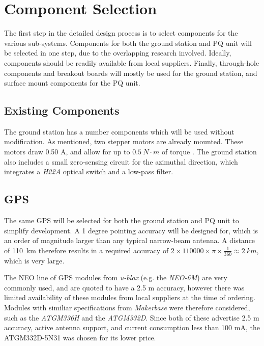 \graphicspath{{./figures}}

\section{Component Selection}
The first step in the detailed design process is to select components for the various sub-systems. Components for both the ground station and PQ unit will be selected in one step, due to the overlapping research involved. Ideally, components should be readily available from local suppliers. Finally, through-hole components and breakout boards will mostly be used for the ground station, and surface mount components for the PQ unit.

\subsection{Existing Components}
The ground station has a number components which will be used without modification. As mentioned, two stepper motors are already mounted. These motors draw 0.50 A, and allow for up to $\SI{0.5}{N \cdot m}$ of torque \cite{datasheet-4118}. The ground station also includes a small zero-sensing circuit for the azimuthal direction, which integrates a \textit{H22A} optical switch \cite{datasheet-H22A1} and a low-pass filter.

\subsection{GPS}\label{sec:components_gps}
The same GPS will be selected for both the ground station and PQ unit to simplify development. A 1 degree pointing accuracy will be designed for, which is an order of magnitude larger than any typical narrow-beam antenna. A distance of \SI{110}{km} therefore results in a required accuracy of $2 \times 110 000 \times \pi \times \frac{1}{360} \approx \SI{2}{km}$, which is very large.

The NEO line of GPS modules from \textit{u-blox} (e.g. the \textit{NEO-6M}) are very commonly used, and are quoted to have a 2.5 m accuracy, however there was limited availability of these modules from local suppliers at the time of ordering. Modules with similiar specifications from \textit{Makerbase} were therefore considered, such as the \textit{ATGM336H} and the \textit{ATGM332D}. Since both of these advertise 2.5 m accuracy, active antenna support, and current consumption less than 100 mA, the ATGM332D-5N31 was chosen for its lower price.

